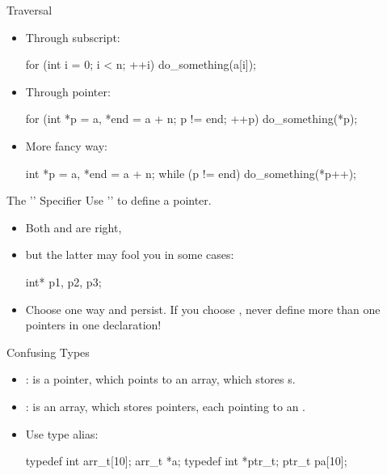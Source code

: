 \documentclass{beamer}
\begin{document}
\begin{frame}[fragile]{Traversal}
	\begin{itemize}
		\item Through subscript:
		\begin{cpp}
for (int i = 0; i < n; ++i)
  do_something(a[i]);
		\end{cpp}
		\item Through pointer:
		\begin{cpp}
for (int *p = a, *end = a + n; p != end; ++p)
  do_something(*p);
		\end{cpp}
		\pause
		\item More fancy way:
		\begin{cpp}
int *p = a, *end = a + n;
while (p != end)
  do_something(*p++);
		\end{cpp}
	\end{itemize}
\end{frame}

\begin{frame}[fragile]{The '\ttt{*}' Specifier}
	Use '\ttt{*}' to define a pointer.
	\begin{itemize}
		\item Both  and  are right,
		\pause
		\item but the latter may fool you in some cases:
		\begin{cpp}
int* p1, p2, p3;
		\end{cpp}
		\pause
		\item Choose one way and persist. If you choose , never define more than one pointers in one declaration!
	\end{itemize}
\end{frame}

\begin{frame}[fragile]{Confusing Types}
	\begin{itemize}
		\item {}:  is a pointer, which points to an array, which stores  s.
		\item {}:  is an array, which stores  pointers, each pointing to an .
		\pause
		\item Use type alias:
		\begin{cpp}
typedef int arr_t[10];
arr_t *a;
typedef int *ptr_t;
ptr_t pa[10];
		\end{cpp}
	\end{itemize}
\end{frame}
\end{document}
